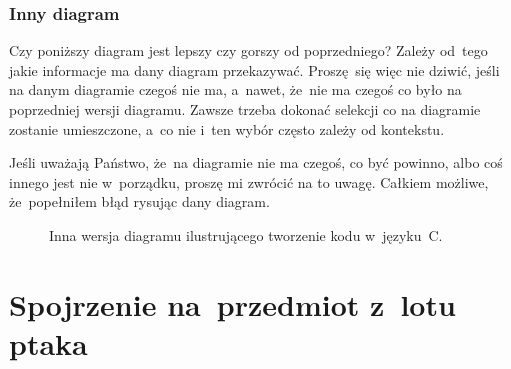\documentclass[10pt,t]{beamer}
\begin{document}
\begin{frame}
  \frametitle{Inny diagram}


  Czy poniższy diagram jest lepszy czy gorszy od poprzedniego? Zależy
  od~tego jakie informacje ma dany diagram przekazywać. Proszę~się więc nie
  dziwić, jeśli na danym diagramie czegoś nie ma, a~nawet, że~nie ma czegoś
  co było na poprzedniej wersji diagramu. Zawsze trzeba dokonać selekcji co
  na diagramie zostanie umieszczone, a~co nie i~ten wybór często zależy
  od kontekstu.

  Jeśli uważają Państwo, że~na diagramie nie ma czegoś, co być powinno,
  albo coś innego jest nie w~porządku, \alert{proszę} mi zwrócić na to
  uwagę. Całkiem możliwe, że~popełniłem błąd rysując dany diagram.






  \begin{figure}

    \label{fig:Also-creating-code-in-C}


    \caption{Inna wersja diagramu ilustrującego tworzenie kodu w~języku~C.}


  \end{figure}

\end{frame}










\section{Spojrzenie na~przedmiot z~lotu ptaka}
\end{document}
